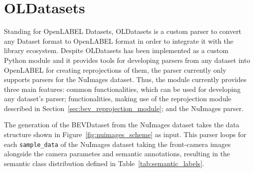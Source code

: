 \section{OLDatasets} \label{appendix:OLDatasets}

Standing for OpenLABEL Datasets, OLDatasets is a custom parser to convert any Dataset format to OpenLABEL format in order to integrate it with the  library ecosystem. Despite OLDatasets has been implemented as a custom Python module and it provides tools for developing parsers from any dataset into OpenLABEL for creating  reprojections of them, the parser currently only supports parsers for the NuImages dataset. Thus, the module currently provides three main features: common functionalities, which can be used for developing any dataset's parser;  functionalities, making use of the  reprojection module described in Section~\ref{sec:bev_reprojection_module}; and the NuImages parser.

The generation of the BEVDataset from the NuImages dataset takes the data structure shown in Figure~\ref{fig:nuimages_scheme} as input. This parser loops for each \texttt{sample\_data} of the NuImages dataset taking the front-camera images alongside the camera parametes and semantic annotations, resulting in the semantic class distribution defined in Table~\ref{tab:semantic_labels}.

